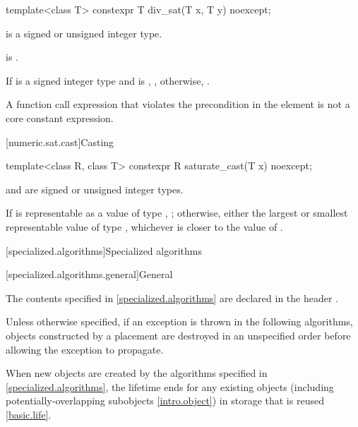 %
\begin{itemdecl}
template<class T>
  constexpr T div_sat(T x, T y) noexcept;
\end{itemdecl}

\begin{itemdescr}
\pnum
\constraints
{} is a signed or unsigned integer type.

\pnum
\expects
{} is .

\pnum
\returns
If  is a signed integer type
and  is ,
, otherwise, .

\pnum
\remarks
A function call expression
that violates the precondition in the  element
is not a core constant expression.
\end{itemdescr}

[numeric.sat.cast]{Casting}

%
\begin{itemdecl}
template<class R, class T>
  constexpr R saturate_cast(T x) noexcept;
\end{itemdecl}

\begin{itemdescr}
\pnum
\constraints
{} and  are signed or unsigned integer types.

\pnum
\returns
If  is representable as a value of type , ;
otherwise, either the largest or smallest representable value of type ,
whichever is closer to the value of .
\end{itemdescr}

[specialized.algorithms]{Specialized  algorithms}

[specialized.algorithms.general]{General}

\pnum
The contents specified in \ref{specialized.algorithms}
are declared in the header .

\pnum
Unless otherwise specified,
if an exception is thrown in the following algorithms,
objects constructed by a placement 
are destroyed in an unspecified order
before allowing the exception to propagate.

\pnum
\begin{note}
When new objects are created by
the algorithms specified in \ref{specialized.algorithms},
the lifetime ends for any existing objects
(including potentially-overlapping subobjects \ref{intro.object})
in storage that is reused \ref{basic.life}.
\end{note}


